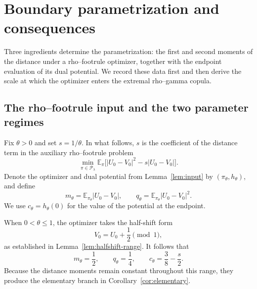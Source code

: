 \documentclass{article}
\theoremstyle{definition}
\theoremstyle{remark}
\newcommand{\1}{\mathds{1}}
\newcommand{\E}{\mathbb{E}}
\newcommand{\couplings}{\mathcal{P}_\lambda}
\begin{document}
\section{Boundary parametrization and consequences}\label{sec:main}

Three ingredients determine the parametrization: the first and second
moments of the distance under a rho--footrule optimizer, together with the
endpoint evaluation of its dual potential. We record these data first and
then derive the scale at which the optimizer enters the extremal rho--gamma
copula.

\subsection{The rho--footrule input and the two parameter regimes}
\label{sec:parametrization}

Fix $\theta>0$ and set $s=1/\theta$. In what follows, $s$ is the coefficient
of the distance term in the auxiliary rho--footrule problem
\begin{equation}\label{eq:auxiliary-problem}
\min_{\pi\in\couplings}
\E_\pi\bigl[|U_0-V_0|^2-s|U_0-V_0|\bigr].
\end{equation}
Denote the optimizer and dual potential from Lemma~\ref{lem:input} by
$(\pi_\theta,h_\theta)$, and define
\[
m_\theta=\E_{\pi_\theta}|U_0-V_0|,
\qquad
q_\theta=\E_{\pi_\theta}|U_0-V_0|^2.
\]
We use $c_\theta=h_\theta(0)$ for the value of the potential at the endpoint.

When $0<\theta\le1$, the optimizer takes the half-shift form
\[
V_0=U_0+\frac12\pmod1,
\]
as established in Lemma~\ref{lem:halfshift-range}. It follows that
\begin{equation}\label{eq:large-parameters}
m_\theta=\frac12,\qquad
q_\theta=\frac14,\qquad
c_\theta=\frac38-\frac s2.
\end{equation}
Because the distance moments remain constant throughout this range, they
produce the elementary branch in Corollary~\ref{cor:elementary}.
\end{document}
